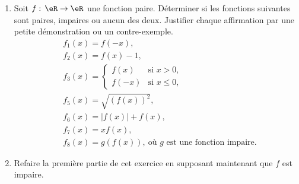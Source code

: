 
\begin{exercice}\label{exoanalyseCTU-0103}

  \begin{enumerate}
  \item Soit $f:\,\eR\to\eR$ une fonction paire. Déterminer si les fonctions suivantes sont paires, impaires ou aucun des deux. Justifier chaque affirmation par une petite démonstration ou un contre-exemple.
      \begin{subequations}
        \begin{align}
          &f_1 (x) = f(-x),\\
          &f_2 (x) = f(x)-1,\\
          &f_3 (x)= 
          \begin{cases}
            f(x) &\text{si } x>0, \\
            f(-x)& \text{si } x\leq 0,
          \end{cases}\\
         &f_5(x) = \sqrt{(f(x))^2},\\
          &f_6(x)= |f(x)| + f(x),\\
          &f_7(x) = xf(x), \\
          &f_8(x) = g(f(x)), \:\text{o\`u $g$ est une fonction impaire}.
        \end{align}
      \end{subequations}
\item Refaire la première partie de cet exercice en supposant maintenant que $f$ est impaire.
  \end{enumerate} 

\end{exercice}
